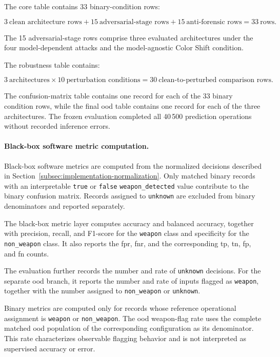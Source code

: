 The core table contains 33 binary-condition rows:

\begin{equation}
3\ \text{clean architecture rows}
+
15\ \text{adversarial-stage rows}
+
15\ \text{anti-forensic rows}
=
33\ \text{rows}.
\end{equation}

The 15 adversarial-stage rows comprise three evaluated architectures under the
four model-dependent attacks and the model-agnostic Color Shift condition.

The robustness table contains:

\begin{equation}
3\ \text{architectures}
\times
10\ \text{perturbation conditions}
=
30\ \text{clean-to-perturbed comparison rows}.
\end{equation}

The confusion-matrix table contains one record for each of the 33 binary
condition rows, while the final \gls{ood} table contains one record for each of
the three architectures. The frozen evaluation completed all 40\,500
prediction operations without recorded inference errors.

\paragraph{Black-box software metric computation.}

Black-box software metrics are computed from the normalized decisions described
in Section~\ref{subsec:implementation-normalization}. Only matched binary
records with an interpretable \texttt{true} or \texttt{false}
\texttt{weapon\_detected} value contribute to the binary confusion matrix.
Records assigned to \texttt{unknown} are excluded from binary denominators and
reported separately.

The black-box metric layer computes accuracy and balanced accuracy, together
with precision, recall, and F1-score for the \texttt{weapon} class and
specificity for the \texttt{non\_weapon} class. It also reports the
\gls{fpr}, \gls{fnr}, and the corresponding \gls{tp}, \gls{tn}, \gls{fp},
and \gls{fn} counts.

The evaluation further records the number and rate of \texttt{unknown}
decisions. For the separate \gls{ood} branch, it reports the number and rate of
inputs flagged as \texttt{weapon}, together with the number assigned to
\texttt{non\_weapon} or \texttt{unknown}.

Binary metrics are computed only for records whose reference operational
assignment is \texttt{weapon} or \texttt{non\_weapon}. The \gls{ood}
weapon-flag rate uses the complete matched \gls{ood} population of the
corresponding configuration as its denominator. This rate characterizes
observable flagging behavior and is not interpreted as supervised accuracy or
error.

